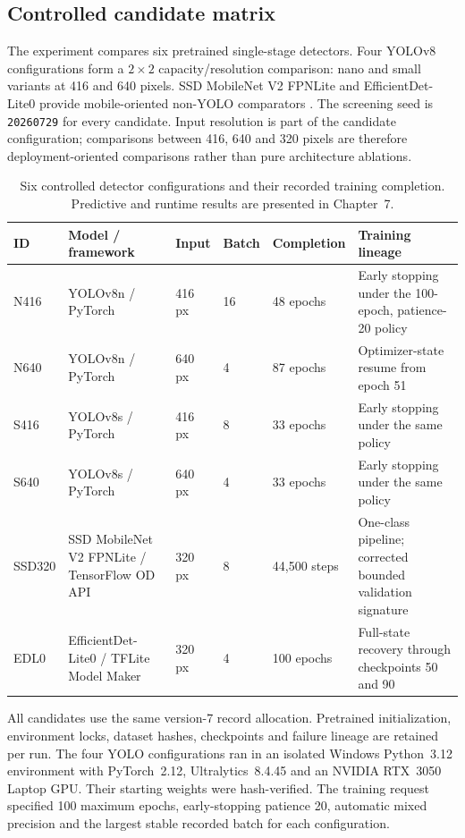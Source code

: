 \subsection{Controlled candidate matrix}

The experiment compares six pretrained single-stage detectors. Four YOLOv8
configurations form a $2\times2$ capacity/resolution comparison: nano and small
variants at 416 and 640 pixels. SSD MobileNet V2 FPNLite and
EfficientDet-Lite0 provide mobile-oriented non-YOLO comparators
\cite{UltralyticsYOLOv8,Liu2016SSD,Sandler2018MobileNetV2,Tan2020EfficientDet}.
The screening seed is \texttt{20260729} for every candidate. Input resolution
is part of the candidate configuration; comparisons between 416, 640 and
320 pixels are therefore deployment-oriented comparisons rather than pure
architecture ablations.

\begin{table}[H]
  \centering
  \caption{Six controlled detector configurations and their recorded training
  completion. Predictive and runtime results are presented in Chapter~7.}
  \label{tab:candidate-training}
  \scriptsize
  \begin{tabularx}{\textwidth}{@{}p{}p{}p{}p{}p{}X@{}}
    \toprule
    ID & Model / framework & Input & Batch & Completion & Training lineage \\
    \midrule
    N416 & YOLOv8n / PyTorch & 416 px & 16 & 48 epochs & Early stopping under the 100-epoch, patience-20 policy \\
    N640 & YOLOv8n / PyTorch & 640 px & 4 & 87 epochs & Optimizer-state resume from epoch 51 \\
    S416 & YOLOv8s / PyTorch & 416 px & 8 & 33 epochs & Early stopping under the same policy \\
    S640 & YOLOv8s / PyTorch & 640 px & 4 & 33 epochs & Early stopping under the same policy \\
    SSD320 & SSD MobileNet V2 FPNLite / TensorFlow OD API & 320 px & 8 & 44,500 steps & One-class pipeline; corrected bounded validation signature \\
    EDL0 & EfficientDet-Lite0 / TFLite Model Maker & 320 px & 4 & 100 epochs & Full-state recovery through checkpoints 50 and 90 \\
    \bottomrule
  \end{tabularx}
\end{table}

All candidates use the same version-7 record allocation. Pretrained
initialization, environment locks, dataset hashes, checkpoints and failure
lineage are retained per run. The four YOLO configurations ran in an isolated
Windows Python~3.12 environment with PyTorch~2.12, Ultralytics~8.4.45 and an
NVIDIA RTX~3050 Laptop GPU. Their starting weights were hash-verified. The
training request specified 100 maximum epochs, early-stopping patience 20,
automatic mixed precision and the largest stable recorded batch for each
configuration.

